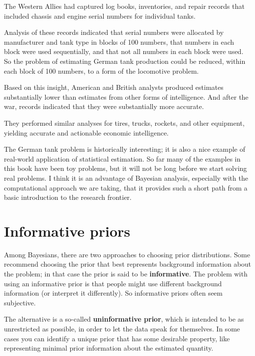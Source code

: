 \documentclass[12pt]{book}
\theoremstyle{exercise}
\begin{document}
The Western Allies had captured log books, inventories, and repair
records that included chassis and engine serial numbers for individual
tanks.

Analysis of these records indicated that serial numbers were allocated
by manufacturer and tank type in blocks of 100 numbers, that numbers
in each block were used sequentially, and that not all numbers in each
block were used.  So the problem of estimating German tank production
could be reduced, within each block of 100 numbers, to a form of the
locomotive problem.

Based on this insight, American and British analysts produced
estimates substantially lower than estimates from other forms
of intelligence.  And after the war, records indicated that they were
substantially more accurate.

They performed similar analyses for tires, trucks, rockets, and other
equipment, yielding accurate and actionable economic intelligence.

The German tank problem is historically interesting; it is also a nice
example of real-world application of statistical estimation.  So far
many of the examples in this book have been toy problems, but it will
not be long before we start solving real problems.  I think it is an
advantage of Bayesian analysis, especially with the computational
approach we are taking, that it provides such a short path from a
basic introduction to the research frontier.


\section{Informative priors}

Among Bayesians, there are two approaches to choosing prior
distributions.  Some recommend choosing the prior that best represents
background information about the problem; in that case the prior
is said to be {\bf informative}.  The problem with using an informative
prior is that people might use different background information (or
interpret it differently).  So informative priors often seem subjective.

The alternative is a so-called {\bf uninformative prior}, which is
intended to be as unrestricted as possible, in order to let the data
speak for themselves.  In some cases you can identify a unique prior
that has some desirable property, like representing minimal prior
information about the estimated quantity.
\end{document}

